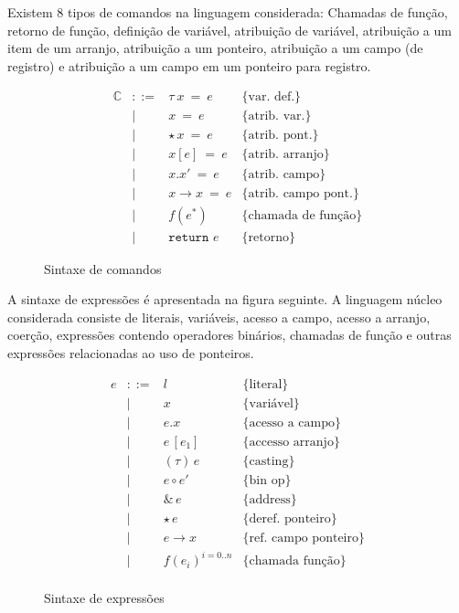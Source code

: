 \documentclass[a4paper,8pt]{article}
\begin{document}
     Existem 8 tipos de comandos na linguagem considerada: Chamadas de
     função, retorno de função, definição de variável, atribuição de
     variável, atribuição a um item de um arranjo, atribuição a um
     ponteiro, atribuição a um campo (de registro) e atribuição a um
     campo em um ponteiro para registro.

     \begin{figure}[H]
       \[
         \begin{array}{lcll}
           \mathbb{C} & ::=   & \tau\:x\:=\:e & \{\text{var. def.}\} \\
             & \mid & x\:=\:e & \{\text{atrib. var.}\} \\
             & \mid & \star\,x\:=\:e & \{\text{atrib. pont.}\} \\
             & \mid & x[e]\:=\:e &\{\text{atrib. arranjo}\} \\
             & \mid & x.x'\: = \: e & \{\text{atrib. campo}\} \\
             & \mid & x\to x\: = \: e & \{\text{atrib. campo pont.}\}\\
             & \mid & f(e^*) & \{\text{chamada de função}\} \\
             & \mid & \texttt{return }e & \{\text{retorno}\}
         \end{array} \]
       \centering
       \caption{Sintaxe de comandos}
       \label{figcmdsyn}
    \end{figure}

    A sintaxe de expressões é apresentada na figura seguinte. A
    linguagem núcleo considerada consiste de literais, variáveis,
    acesso a campo, acesso a arranjo, coerção, expressões contendo
    operadores binários, chamadas de função e outras expressões
    relacionadas ao uso de ponteiros.

    \begin{figure}[H]
       \[
         \begin{array}{lcll}
           e & ::= & l & \{\text{literal}\} \\
             & \mid & x & \{\text{variável}\} \\
             & \mid & e . x & \{\text{acesso a campo}\}\\
             & \mid & e\,[e_1] & \{\text{accesso arranjo}\} \\
             & \mid & (\tau)\,e & \{\text{casting}\} \\
             &\mid & e\circ e' & \{\text{bin op}\} \\
             & \mid & \&\,e & \{\text{address}\} \\
             & \mid & \star\,e & \{\text{deref. ponteiro}\}\\
             & \mid & e \to x & \{\text{ref. campo ponteiro}\}\\
             & \mid & f(e_i)^{i=0..n} & \{\text{chamada função}\}\\
         \end{array} \]
         \centering
         \caption{Sintaxe de expressões}
         \label{exprsyn}
    \end{figure}
\end{document}
